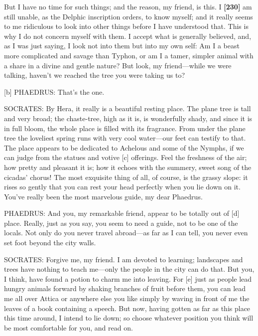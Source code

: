 But I have no time for such things; and the reason, my friend, is this.
I {\bf {[}230{]}} am still unable, as the Delphic inscription orders, to
know myself; and it really seems to me ridiculous to look into other
things before I have understood that. This is why I do not concern
myself with them. I accept what is generally believed, and, as I was
just saying, I look not into them but into my own self: Am I a beast
more complicated and savage than
Typhon, or am I a tamer,
simpler animal with a share in a divine and gentle nature? But look, my
friend---while we were talking, haven't we reached the tree you were
taking us to?

{[}b{]} PHAEDRUS: That's the one.

SOCRATES: By Hera, it really is a beautiful resting place. The plane
tree is tall and very broad; the chaste-tree, high as it is, is
wonderfully shady, and since it is in full bloom, the whole place is
filled with its fragrance. From under the plane tree the loveliest
spring runs with very cool water---our feet can testify to that. The
place appears to be dedicated to Achelous and some of the Nymphs, if we
can judge from the statues and votive {[}c{]}
offerings. Feel the
freshness of the air; how pretty and pleasant it is; how it echoes with
the summery, sweet song of the cicadas' chorus! The most exquisite thing
of all, of course, is the grassy slope: it rises so gently that you can
rest your head perfectly when you lie down on it. You've really been the
most marvelous guide, my dear Phaedrus.

PHAEDRUS: And you, my remarkable friend, appear to be totally out of
{[}d{]} place. Really, just as you say, you seem to need a guide, not to
be one of the locals. Not only do you never travel abroad---as far as I
can tell, you never even set foot beyond the city walls.

SOCRATES: Forgive me, my friend. I am devoted to learning; landscapes
and trees have nothing to teach me---only the people in the city can do
that. But you, I think, have found a potion to charm me into leaving.
For {[}e{]} just as people lead hungry animals forward by shaking
branches of fruit before them, you can lead me all over Attica or
anywhere else you like simply by waving in front of me the leaves of a
book containing a speech. But now, having gotten as far as this place
this time around, I intend to lie down; so choose whatever position you
think will be most comfortable for you, and read on.

